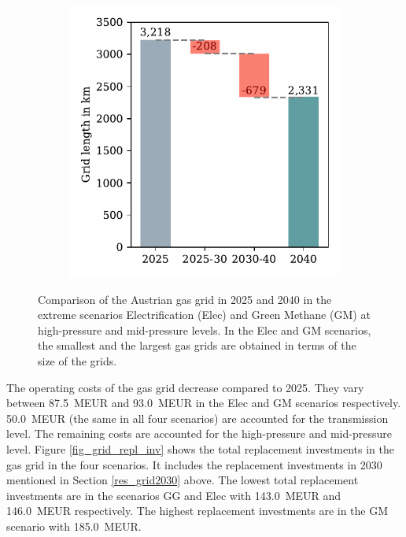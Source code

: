 \begin{figure}[h]
\begin{subfigure}[c]{0.5\textwidth}
		\vspace{-0.6cm}
		\label{Fig:c}
	\end{subfigure}
	\begin{subfigure}[c]{0.5\textwidth}
		\centering
		\includegraphics[width=1\linewidth]{figures/results/waterfall/waterfall_gm_mid.pdf}
		\vspace{-0.6cm}
		\label{Fig:d}
	\end{subfigure}
	\caption{Comparison of the Austrian gas grid in 2025 and 2040 in the extreme scenarios Electrification (Elec) and Green Methane (GM) at high-pressure and mid-pressure levels. In the Elec and GM scenarios, the smallest and the largest gas grids are obtained in terms of the size of the grids.}
	\label{fig_reduction_waterfall}
\end{figure}

The operating costs of the gas grid decrease compared to 2025. They vary between \SI{87.5}{MEUR} and \SI{93.0}{MEUR} in the Elec and GM scenarios respectively. \SI{50.0}{MEUR} (the same in all four scenarios) are accounted for the transmission level. The remaining costs are accounted for the high-pressure and mid-pressure level. Figure \ref{fig_grid_repl_inv} shows the total replacement investments in the gas grid in the four scenarios. It includes the replacement investments in 2030 mentioned in Section \ref{res_grid2030} above. The lowest total replacement investments are in the scenarios GG and Elec with \SI{143.0}{MEUR} and \SI{146.0}{MEUR} respectively. The highest replacement investments are in the GM scenario with \SI{185.0}{MEUR}. 

